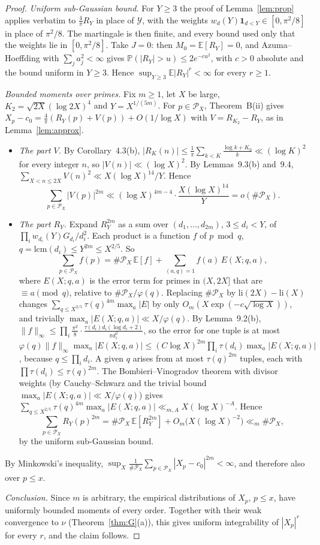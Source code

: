 \documentclass[11pt]{amsart}
\theoremstyle{remark}
\newcommand{\E}{\mathbb{E}}
\newcommand{\Prob}{\mathbb{P}}
\begin{document}
\begin{proof}
\emph{Uniform sub-Gaussian bound.} For $Y\ge3$ the proof of Lemma~\ref{lem:prop} applies verbatim to $\frac4\pi R_Y$ in place of $\mathcal Y$, with the weights $w_d(Y)\mathbf 1_{d<Y}\in[0,\pi^2/8]$ in place of $\pi^2/8$. The martingale is then finite, and every bound used only that the weights lie in $[0,\pi^2/8]$. Take $J=0$: then $M_0=\E[R_Y]=0$, and Azuma--Hoeffding with $\sum_ja_j^2<\infty$ gives $\Prob(|R_Y|>u)\le2e^{-cu^2}$, with $c>0$ absolute and the bound uniform in $Y\ge3$. Hence $\sup_{Y\ge3}\E|R_Y|^r<\infty$ for every $r\ge1$.

\emph{Bounded moments over primes.} Fix $m\ge1$, let $X$ be large, $K_2=\sqrt{2X}(\log2X)^4$ and $Y=X^{1/(5m)}$. For $p\in\mathcal P_X$, Theorem~B(ii) gives $X_p-c_0=\frac4\pi(R_Y(p)+V(p))+O(1/\log X)$ with $V=R_{K_2}-R_Y$, as in Lemma~\ref{lem:approx}.
\begin{itemize}
\item \emph{The part $V$.} By Corollary~4.3(b), $|R_K(n)|\le\frac1\pi\sum_{k<K}\frac{\log k+K_0}k\ll(\log K)^2$ for every integer $n$, so $|V(n)|\ll(\log X)^2$. By Lemmas~9.3(b) and~9.4, $\sum_{X<n\le2X}V(n)^2\ll X(\log X)^{14}/Y$. Hence
\[
\sum_{p\in\mathcal P_X}|V(p)|^{2m}\ll(\log X)^{4m-4}\cdot\frac{X(\log X)^{14}}Y=o(\#\mathcal P_X).
\]
\item \emph{The part $R_Y$.} Expand $R_Y^{2m}$ as a sum over $(d_1,\dots,d_{2m})$, $3\le d_i<Y$, of $\prod_iw_{d_i}(Y)G_{d_i}/d_i^2$. Each product is a function $f$ of $p\bmod q$, $q=\mathrm{lcm}(d_i)\le Y^{2m}\le X^{2/5}$. So
\[
\sum_{p\in\mathcal P_X}f(p)=\#\mathcal P_X\,\E[f]+\sum_{(a,q)=1}f(a)\,E(X;q,a),
\]
where $E(X;q,a)$ is the error term for primes in $(X,2X]$ that are $\equiv a\pmod q$, relative to $\#\mathcal P_X/\varphi(q)$. Replacing $\#\mathcal P_X$ by $\mathrm{li}(2X)-\mathrm{li}(X)$ changes $\sum_{q\le X^{2/5}}\tau(q)^{4m}\max_a|E|$ by only $O_m(X\exp(-c\sqrt{\log X}))$, and trivially $\max_a|E(X;q,a)|\ll X/\varphi(q)$. By Lemma~9.2(b), $\|f\|_\infty\le\prod_i\frac{\pi^2}8\cdot\frac{\tau(d_i)d_i(\log d_i+2)}{\pi d_i^2}$, so the error for one tuple is at most $\varphi(q)\|f\|_\infty\max_a|E(X;q,a)|\le(C\log X)^{2m}\prod_i\tau(d_i)\max_a|E(X;q,a)|$, because $q\le\prod_id_i$. A given $q$ arises from at most $\tau(q)^{2m}$ tuples, each with $\prod\tau(d_i)\le\tau(q)^{2m}$. The Bombieri--Vinogradov theorem with divisor weights (by Cauchy--Schwarz and the trivial bound $\max_a|E(X;q,a)|\ll X/\varphi(q)$) gives $\sum_{q\le X^{2/5}}\tau(q)^{4m}\max_a|E(X;q,a)|\ll_{m,A}X(\log X)^{-A}$. Hence
\[
\sum_{p\in\mathcal P_X}R_Y(p)^{2m}=\#\mathcal P_X\,\E[R_Y^{2m}]+O_m\big(X(\log X)^{-2}\big)\ll_m\#\mathcal P_X,
\]
by the uniform sub-Gaussian bound.
\end{itemize}
By Minkowski's inequality, $\sup_X\frac1{\#\mathcal P_X}\sum_{p\in\mathcal P_X}|X_p-c_0|^{2m}<\infty$, and therefore also over $p\le x$.

\emph{Conclusion.} Since $m$ is arbitrary, the empirical distributions of $X_p$, $p\le x$, have uniformly bounded moments of every order. Together with their weak convergence to $\nu$ (Theorem~\ref{thm:G}(a)), this gives uniform integrability of $|X_p|^r$ for every $r$, and the claim follows.
\end{proof}
\end{document}
